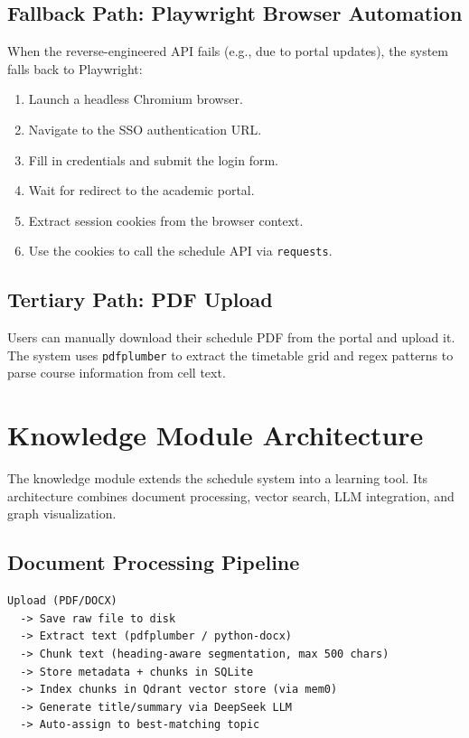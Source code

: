 \documentclass[12pt,a4paper]{article}
\begin{document}
\subsection{Fallback Path: Playwright Browser Automation}

When the reverse-engineered API fails (e.g., due to portal updates), the system falls back to Playwright:
\begin{enumerate}[nosep]
    \item Launch a headless Chromium browser.
    \item Navigate to the SSO authentication URL.
    \item Fill in credentials and submit the login form.
    \item Wait for redirect to the academic portal.
    \item Extract session cookies from the browser context.
    \item Use the cookies to call the schedule API via \texttt{requests}.
\end{enumerate}

\subsection{Tertiary Path: PDF Upload}

Users can manually download their schedule PDF from the portal and upload it. The system uses \texttt{pdfplumber} to extract the timetable grid and regex patterns to parse course information from cell text.

\section{Knowledge Module Architecture}
\label{sec:knowledge}

The knowledge module extends the schedule system into a learning tool. Its architecture combines document processing, vector search, LLM integration, and graph visualization.

\subsection{Document Processing Pipeline}

\begin{verbatim}
Upload (PDF/DOCX)
  -> Save raw file to disk
  -> Extract text (pdfplumber / python-docx)
  -> Chunk text (heading-aware segmentation, max 500 chars)
  -> Store metadata + chunks in SQLite
  -> Index chunks in Qdrant vector store (via mem0)
  -> Generate title/summary via DeepSeek LLM
  -> Auto-assign to best-matching topic
\end{verbatim}
\end{document}
